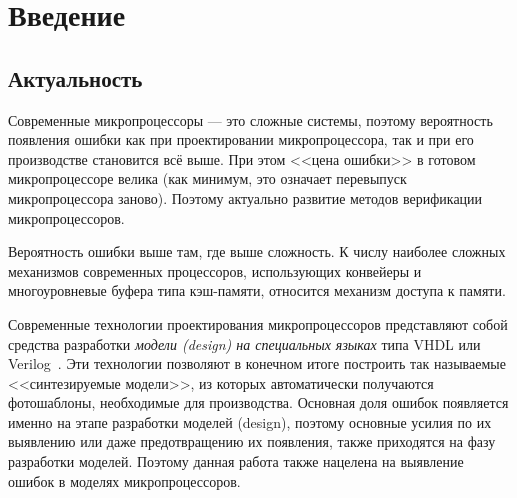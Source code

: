 \documentclass[14pt]{extreport}
\begin{document}
\pagebreak

\tableofcontents









\chapter*{Введение}

\section*{Актуальность}
Современные микропроцессоры --- это сложные системы, поэтому вероятность появления ошибки как при проектировании микропроцессора, так и при его производстве становится всё выше. При этом <<цена ошибки>> в готовом микропроцессоре велика (как минимум, это означает перевыпуск микропроцессора заново). Поэтому актуально развитие методов верификации микропроцессоров.

Вероятность ошибки выше там, где выше сложность. К числу наиболее сложных механизмов современных процессоров, использующих конвейеры и многоуровневые буфера типа кэш-памяти, относится механизм доступа к памяти.



Современные технологии проектирования микропроцессоров представляют собой средства разработки \emph{модели (design) на специальных языках} типа VHDL или Verilog~\cite{VerilogDesign}. Эти технологии позволяют в конечном итоге построить так называемые <<синтезируемые модели>>, из которых автоматически получаются фотошаблоны, необходимые для производства. Основная доля ошибок появляется именно на этапе разработки моделей (design), поэтому основные усилия по их выявлению или даже предотвращению их появления, также приходятся на фазу разработки моделей. Поэтому данная работа также нацелена на выявление ошибок в моделях микропроцессоров.
\end{document}
